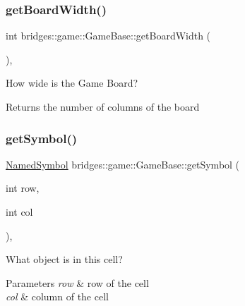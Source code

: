 \subsubsection{\texorpdfstring{getBoardWidth()}{getBoardWidth()}}
{\footnotesize\ttfamily int bridges\+::game\+::\+Game\+Base\+::get\+Board\+Width (\begin{DoxyParamCaption}{ }\end{DoxyParamCaption})\hspace{0.3cm}{\ttfamily [inline]}, {\ttfamily [protected]}}



How wide is the Game Board? 

\begin{DoxyReturn}{Returns}
the number of columns of the board 
\end{DoxyReturn}
\mbox{\label{classbridges_1_1game_1_1_game_base_a0dfec715b0ed49c37b4b6689f2470b25}} 
\subsubsection{\texorpdfstring{getSymbol()}{getSymbol()}}
{\footnotesize\ttfamily \mbox{\hyperlink{namespacebridges_1_1game_ab9a19c7ab6e2ebac2f95180e21733487}{Named\+Symbol}} bridges\+::game\+::\+Game\+Base\+::get\+Symbol (\begin{DoxyParamCaption}\item[{int}]{row,  }\item[{int}]{col }\end{DoxyParamCaption})\hspace{0.3cm}{\ttfamily [inline]}, {\ttfamily [protected]}}



What object is in this cell? 


\begin{DoxyParams}{Parameters}
{\em row} & row of the cell \\
\hline
{\em col} & column of the cell \\
\hline
\end{DoxyParams}
\mbox{\label{classbridges_1_1game_1_1_game_base_a26c9f9547cc6f992a829ce5d6edd8f85}} 
